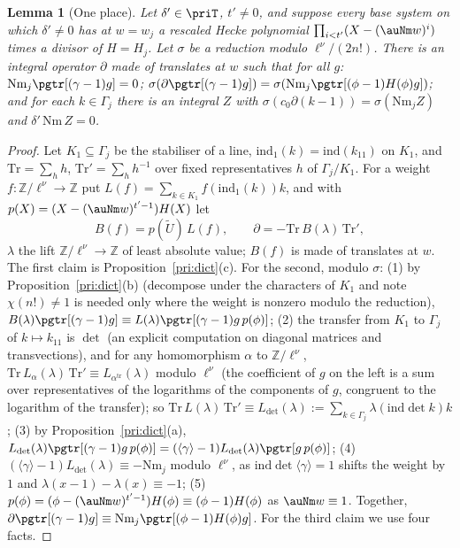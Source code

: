 \documentclass[10pt]{amsart}
\newtheorem{lemma}[theorem]{Lemma}
\theoremstyle{definition}
\theoremstyle{remark}
\newcommand{\Z}{\mathbb Z}
\begin{document}
\begin{lemma}[One place]
\label{pri:oneplace}
Let $\delta'\in\priT$, $t'\ne0$, and suppose every base system on which $\delta'\ne0$ has at $w=w_j$
a rescaled Hecke polynomial $\prod_{i<t'}(X-(\auNm w)^i)$ times a divisor of $H=H_j$. Let $\sigma$ be a
reduction modulo $\ell^\nu/(2n!)$. There is an integral operator $\partial$ made of translates at $w$
such that for all $g$: $\mathrm{Nm}_j\pgtr[(\gamma-1)g]=0$; $\sigma(\partial\pgtr[(\gamma-1)g])=
\sigma(\mathrm{Nm}_j\pgtr[(\phi-1)H(\phi)g])$; and for each $k\in\Gamma_j$ there is an integral $Z$ with
$\sigma(c_0\partial(k-1))=\sigma(\mathrm{Nm}_jZ)$ and $\delta'\,\mathrm{Nm}\,Z=0$.
\end{lemma}
\begin{proof}
Let $K_1\subseteq\Gamma_j$ be the stabiliser of a line, $\mathrm{ind}_1(k)=\mathrm{ind}(k_{11})$ on
$K_1$, and $\mathrm{Tr}=\sum_hh$, $\mathrm{Tr}'=\sum_hh^{-1}$ over fixed representatives $h$ of
$\Gamma_j/K_1$. For a weight $f\colon\Z/\ell^\nu\to\Z$ put $L(f)=\sum_{k\in K_1}f(\mathrm{ind}_1(k))k$,
and with $p(X)=(X-(\auNm w)^{t'-1})H(X)$ let
\begin{equation}\label{pri:eq-B}
B(f)=p(\tilde U)\,L(f),\qquad\partial=-\mathrm{Tr}\,B(\lambda)\,\mathrm{Tr}',
\end{equation}
$\lambda$ the lift $\Z/\ell^\nu\to\Z$ of least absolute value; $B(f)$ is made of translates at $w$. The first claim is Proposition~\ref{pri:dict}(c).
For the second, modulo $\sigma$: (1) by Proposition~\ref{pri:dict}(b) (decompose under the
characters of $K_1$ and note $\chi(n!)\ne1$ is needed only where the weight is nonzero modulo the
reduction), $B(\lambda)\pgtr[(\gamma-1)g]\equiv L(\lambda)\pgtr[(\gamma-1)g\,p(\phi)]$; (2) the
transfer from $K_1$ to $\Gamma_j$ of $k\mapsto k_{11}$ is $\det$ (an explicit computation on diagonal
matrices and transvections), and for any homomorphism $\alpha$ to
$\Z/\ell^\nu$, $\mathrm{Tr}\,L_\alpha(\lambda)\,\mathrm{Tr}'\equiv L_{\alpha^{\mathrm{tr}}}(\lambda)$
modulo $\ell^\nu$ (the coefficient of $g$ on the left is a sum over representatives of the logarithms
of the components of $g$, congruent to the logarithm of the transfer); so $\mathrm{Tr}\,L(\lambda)\,
\mathrm{Tr}'\equiv L_{\det}(\lambda):=\sum_{k\in\Gamma_j}\lambda(\mathrm{ind}\det k)k$; (3) by
Proposition~\ref{pri:dict}(a), $L_{\det}(\lambda)\pgtr[(\gamma-1)g\,p(\phi)]=(\langle\gamma\rangle-1)
L_{\det}(\lambda)\pgtr[g\,p(\phi)]$; (4) $(\langle\gamma\rangle-1)L_{\det}(\lambda)\equiv-\mathrm{Nm}_j$
modulo $\ell^\nu$, as $\mathrm{ind}\det\langle\gamma\rangle=1$ shifts the weight by $1$ and
$\lambda(x-1)-\lambda(x)\equiv-1$; (5) $p(\phi)=(\phi-(\auNm w)^{t'-1})H(\phi)\equiv(\phi-1)H(\phi)$ as
$\auNm w\equiv1$. Together, $\partial\pgtr[(\gamma-1)g]\equiv\mathrm{Nm}_j\pgtr[(\phi-1)H(\phi)g]$.
For the third claim we use four facts.


\end{proof}
\end{document}
